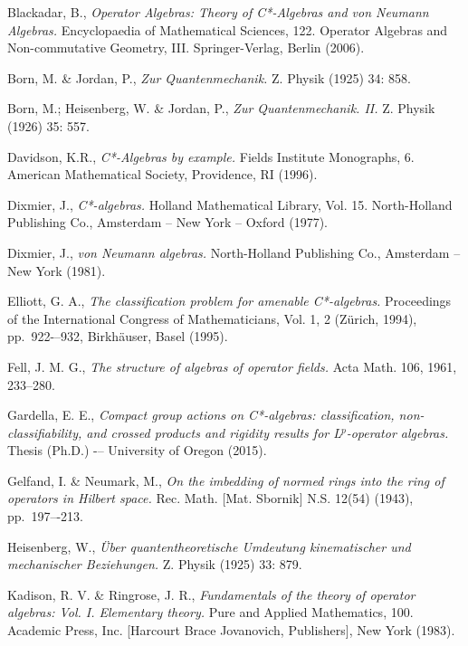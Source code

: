 \documentclass[12pt,a4paper]{report}
\theoremstyle{plain}
\theoremstyle{definition}
\newcommand{\1}{\mathbbm{1}}
\begin{document}
\begin{thebibliography}{00}
	Blackadar, B.,
	\emph{Operator Algebras: Theory of C*-Algebras and von Neumann Algebras.}
	Encyclopaedia of Mathematical Sciences, 122. Operator Algebras and Non-commutative Geometry, III. Springer-Verlag, Berlin (2006).
	
	Born, M. \& Jordan, P.,
	\emph{Zur Quantenmechanik.}
	Z. Physik (1925) 34: 858.
	
	Born, M.; Heisenberg, W. \& Jordan, P.,
	\emph{Zur Quantenmechanik. II.}
	Z. Physik (1926) 35: 557.

	Davidson, K.R.,
	\emph{C*-Algebras by example.}
	Fields Institute Monographs, 6. American Mathematical Society, Providence, RI (1996).

	Dixmier, J.,
	\emph{C*-algebras.}
	Holland Mathematical Library, Vol. 15. North-Holland Publishing Co., Amsterdam -- New York -- Oxford (1977).

	Dixmier, J.,
	\emph{von Neumann algebras.}
	North-Holland Publishing Co., Amsterdam -- New York (1981).
		
	Elliott, G. A.,
	\emph{The classification problem for amenable C*-algebras.}
	Proceedings of the International Congress of Mathematicians, Vol. 1, 2 (Z\"{u}rich, 1994), pp.~922-–932, Birkhäuser, Basel (1995).

	Fell, J. M. G.,
	\emph{The structure of algebras of operator fields. }
	Acta Math. 106, 1961, 233–280. 


	Gardella, E. E.,
	\emph{Compact group actions on C*-algebras: classification, non-classifiability, and crossed products and rigidity results for L$^p$-operator algebras. }
	Thesis (Ph.D.) -– University of Oregon (2015).

	Gelfand, I. \& Neumark, M.,
	\emph{On the imbedding of normed rings into the ring of operators in Hilbert space.}
	Rec. Math. [Mat. Sbornik] N.S. 12(54) (1943), pp.~197–-213.

	Heisenberg, W.,
	\emph{{\"U}ber quantentheoretische Umdeutung kinematischer und mechanischer Beziehungen.}
	Z. Physik (1925) 33: 879. 
	
	Kadison, R. V. \& Ringrose, J. R.,
	\emph{Fundamentals of the theory of operator algebras: Vol. I. Elementary theory.}
	Pure and Applied Mathematics, 100. Academic Press, Inc. [Harcourt Brace Jovanovich, Publishers], New York (1983).


\end{thebibliography}
\end{document}
